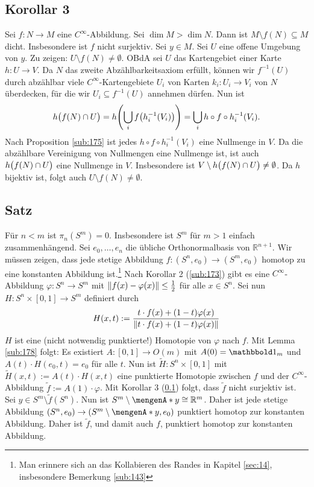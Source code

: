 \subsection[Korollar 3: Für $f : N \to M$ glatt ist $M \setminus f(N) \subseteq M$ dicht, wenn $\dim M > \dim N$]{Korollar 3} %
\label{sub:176}
Sei $f : N \to M$ eine $C^\infty$-Abbildung. Sei $\dim M > \dim N$. Dann ist $M \setminus f(N) \subseteq M$ dicht. Insbesondere ist $f$ nicht surjektiv.
Sei $y \in M$. Sei $U$ eine offene Umgebung von $y$. Zu zeigen: $U \setminus f(N) \not= \emptyset$. OBdA sei $U$ das Kartengebiet einer Karte $h : U\to V$. Da $N$ das 
zweite Abzählbarkeitsaxiom erfüllt, können wir $f ^{-1}(U)$ durch abzählbar viele $C^\infty$-Kartengebiete $U_i$ von Karten $k_i : U_i \to V_i$ von $N$ überdecken, für die
wir $U_i \subseteq f ^{-1}(U)$ annehmen dürfen. Nun ist
\[
	h \enbrace[\big]{f(N) \cap U}  = h \enbrace*{\bigcup_{i} f\enbrace*{h_i ^{-1}(V_i)}} = \bigcup_i h \circ f \circ h_i ^{-1} (V_i).
\]
Nach Proposition \ref{sub:175} ist jedes $h \circ f \circ h_i ^{-1}(V_i)$ eine Nullmenge in $V$. Da die abzählbare Vereinigung von Nullmengen eine Nullmenge ist, ist auch
$h \enbrace[\big]{f(N) \cap U}$ eine Nullmenge in $V$. Insbesondere ist $V \setminus h \enbrace[\big]{f(N)\cap U} \not= \emptyset$. Da $h$ bijektiv ist, folgt auch 
$U \setminus f(N) \not= \emptyset$. \bewende 

\subsection[Satz: Für $n < m$ ist $\pi_n (S^m) = 0$]{Satz} %
\label{sub:177}
Für $n < m$ ist $\pi_n (S^m) = 0$. Insbesondere ist $S^m$ für $m>1$ einfach zusammenhängend.
Sei $e_0, \ldots , e_n$ die übliche Orthonormalbasis von $\mathds{R}^{n+1}$.
Wir müssen zeigen, dass jede stetige Abbildung $f : (S^n, e_0) \to (S^m, e_0)$ homotop zu eine konstanten Abbildung ist.\footnote{Man erinnere sich an das Kollabieren des 
Randes in Kapitel \ref{sec:14}, insbesondere Bemerkung \ref{sub:143}} Nach Korollar 2 (\ref{sub:173}) gibt es eine 
$C^\infty$-Abbildung $\varphi : S^n \to S^m$ mit $\norm{f(x)- \varphi(x)} \le \frac{1}{2}$ für alle $x \in S^n$. Sei nun $H : S^n \times [0,1] \to S^m$ definiert durch
\[
	H(x,t) := \frac{t \cdot f(x)+ (1-t)\varphi(x)}{\norm{t \cdot f(x) + (1-t) \varphi(x)}} 
\]
$H$ ist eine (nicht notwendig punktierte!) Homotopie von $\varphi$ nach $f$. Mit Lemma \ref{sub:178} folgt: Es existiert $A : [0,1] \to O(m)$ mit $A(0)= \ind_m$ und
$A(t) \cdot H(e_0,t) = e_0$ für alle $t$. Nun ist $\tilde{H} : S^n \times [0,1]$ mit $\tilde{H}(x,t) := A(t) \cdot H(x,t)$ eine punktierte Homotopie zwischen $f$ und
der $C^\infty$-Abbildung $\tilde{f} := A(1) \cdot \varphi$. Mit Korollar 3 (\ref{sub:176}) folgt, dass $\tilde{f}$ nicht surjektiv ist. Sei $y \in S^m \setminus \tilde{f}(S^n)$. Nun ist
$S^m \setminus \set{y} \cong \mathds{R}^m$. Daher ist jede stetige Abbildung $(S^n, e_0) \to (S^m \setminus \set{y} ,e_0)$ punktiert homotop zur konstanten Abbildung. Daher ist $\tilde{f}$,
und damit auch $f$, punktiert homotop zur konstanten Abbildung. \bewende


